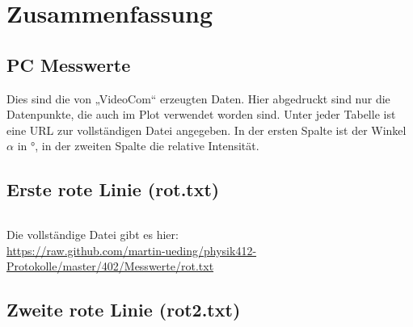 
\FloatBarrier
\section{Zusammenfassung}

\fehlt


\FloatBarrier
\begin{appendix}
    \section{PC Messwerte}
    \label{sec:pc_messwerte}

    Dies sind die von „VideoCom“ erzeugten Daten. Hier abgedruckt sind nur die
    Datenpunkte, die auch im Plot verwendet worden sind. Unter jeder Tabelle
    ist eine URL zur vollständigen Datei angegeben. In der ersten Spalte ist
    der Winkel $\alpha$ in $\si\degree$, in der zweiten Spalte die relative
    Intensität.

    \subsection{Erste rote Linie (rot.txt)}
    \begin{multicols}{5}
        \inputminted[tabsize=4, firstline=<< rot_lower >>, lastline=<< rot_upper >>, fontsize=\footnotesize]{text}{../Messwerte/rot.txt}
    \end{multicols}

    Die vollständige Datei gibt es hier: \\
    \url{https://raw.github.com/martin-ueding/physik412-Protokolle/master/402/Messwerte/rot.txt}

    \subsection{Zweite rote Linie (rot2.txt)}
    \begin{multicols}{5}
        \inputminted[tabsize=4, firstline=<< rot2_lower >>, lastline=<< rot2_upper >>, fontsize=\footnotesize]{text}{../Messwerte/rot2.txt}
    \end{multicols}


\end{appendix}
